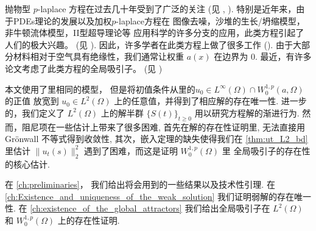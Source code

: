 \documentclass[twoside,longtitle]{LZUthesis}
\theoremstyle{definition}
\numberwithin{equation}{chapter}
\newcommand*\norm[1]{\lVert#1\rVert}
\newcommand*\Brace[1]{\lbrace#1\rbrace}
\begin{document}
抛物型 $p$-laplace 方程在过去几十年受到了广泛的关注
(见 \citep{liuAsymptoticRegularityPLaplacian2010,zhongZ2IndexGlobal2010,acerbiRegularityResultsStationary2002,rajagopalMathematicalModelingElectrorheological2001,aboulaichNewDiffusionModels2008,guoSingularPhenomenaSolutions2015,antontsevUniquenessComparisonTheorems2013,gaoExistenceUniquenessNonexistence2016,liuNonlinearDiffusionProblem2019,guoStudyWeakSolutions2011,antontsevParabolicEquationsAnisotropic2007,constantinGlobalExistenceFully2006,constantinGlobalSolutionsQuasilinear2002},
).
特别是近年来，由于PDEs理论的发展以及加权$p$-laplace方程在
图像去噪，沙堆的生长/坍缩模型，非牛顿流体模型，II型超导理论等
应用科学的许多分支的应用，此类方程引起了人们的极大兴趣。
(见 \citep{aronssonFastSlowDiffusion1996,aubertMathematicalProblemsImage2006,mastorakisSolutionPLaplacianNonNewtonian2009,yinLaplacianTypeEvolution2001}).
因此，许多学者在此类方程上做了很多工作
(\citep{cortazarExistenceSignChanging2014,musinaExistenceMultiplicityResults2009,gazziniSobolevtypeInequalityRelated2009,liLongtimeBehaviorClass2014b,maGlobalAttractorsWeighted2012a,cavalheiroWeightedSobolevSpaces2008,caldiroliVariationalDegenerateElliptic2000,leBoundaryValueProblems1998,monticelliMaximumPrinciplesWeak2009,dibenedettoDegenerateSingularParabolic1993,galClassDegenerateParabolic2012,yinEvolutionaryWeightedPLaplacian2007,Zhan2019Uniquenessa}).
由于大部分材料相对于空气具有绝缘性，我们通常让权重 $a(x)$ 在边界为 $0$.
最近，有许多论文考虑了此类方程的全局吸引子。
(见 \citep{anhGlobalExistenceLongtime2008,anhGlobalAttractorMsemiflow2010,anhLongtimeBehaviorQuasilinear2009,karachaliosConvergenceAttractorsDegenerate2005,karachaliosDynamicsDegenerateParabolic2006,karachaliosGlobalAttractorsConvergence2005})

本文使用了\citep{Zhan2019Uniquenessa}里相同的模型，
但是将初值条件从\citep{Zhan2019Uniquenessa}里的$u_0 \in L^{\infty}(\Omega) \cap W_0^{1,p}(a,\Omega)$的正值
放宽到 $u_0 \in L^2(\Omega)$ 上的任意值，并得到了相应解的存在唯一性.
进一步的，我们定义了 $L^2(\Omega) $ 上的解半群 $\Brace{S(t)}_{t \geq 0} $ 用以研究方程解的渐进行为.
然而，阻尼项在一些估计上带来了很多困难, 首先在解的存在性证明里,
无法直接用 Gr\"onwall 不等式得到收敛性,
其次，嵌入定理的缺失使得我们在 \cref{thm:ut_L2_bd} 里估计
$\norm{u_t(s)}_2^2$ 遇到了困难，而这是证明 $W_0^{1,p}(\Omega)$ 里
全局吸引子的存在性的核心估计.

在 \cref{ch:preliminaries}，
我们给出将会用到的一些结果以及技术性引理. 在
\cref{ch:Existence_and_uniqueness_of_the_weak_solution}
我们证明弱解的存在唯一性.
在 \cref{ch:existence_of_the_global_attractors}
我们给出全局吸引子在
$L^2(\Omega)$ 和 $W_0^{1,p}(\Omega)$ 上的存在性证明.
\end{document}
